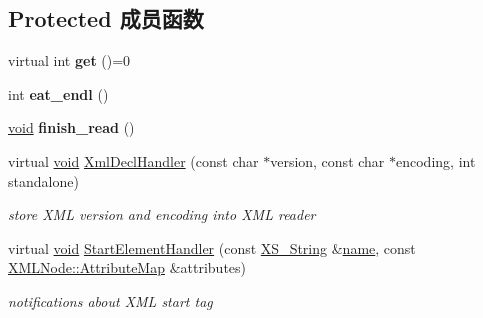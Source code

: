 \subsection*{Protected 成员函数}
\begin{DoxyCompactItemize}
\item 
\mbox{\label{struct_x_m_l_storage_1_1_x_m_l_reader_base_a57b853549c1a3f8ac5f17577f05d1724}} 
virtual int {\bfseries get} ()=0
\item 
\mbox{\label{struct_x_m_l_storage_1_1_x_m_l_reader_base_a24ae151486d9944db9fba64307551d3b}} 
int {\bfseries eat\+\_\+endl} ()
\item 
\mbox{\label{struct_x_m_l_storage_1_1_x_m_l_reader_base_a445261640670478c73941e375875541d}} 
\hyperlink{interfacevoid}{void} {\bfseries finish\+\_\+read} ()
\item 
\mbox{\label{struct_x_m_l_storage_1_1_x_m_l_reader_base_a2a79dba25ffe2739f26550fa778e5131}} 
virtual \hyperlink{interfacevoid}{void} \hyperlink{struct_x_m_l_storage_1_1_x_m_l_reader_base_a2a79dba25ffe2739f26550fa778e5131}{Xml\+Decl\+Handler} (const char $\ast$version, const char $\ast$encoding, int standalone)
\begin{DoxyCompactList}\small\item\em store X\+ML version and encoding into X\+ML reader \end{DoxyCompactList}\item 
\mbox{\label{struct_x_m_l_storage_1_1_x_m_l_reader_base_a13f8c23bfe885e07aab003e23facd674}} 
virtual \hyperlink{interfacevoid}{void} \hyperlink{struct_x_m_l_storage_1_1_x_m_l_reader_base_a13f8c23bfe885e07aab003e23facd674}{Start\+Element\+Handler} (const \hyperlink{struct_x_m_l_storage_1_1_x_s___string}{X\+S\+\_\+\+String} \&\hyperlink{structname}{name}, const \hyperlink{struct_x_m_l_storage_1_1_x_m_l_node_1_1_attribute_map}{X\+M\+L\+Node\+::\+Attribute\+Map} \&attributes)
\begin{DoxyCompactList}\small\item\em notifications about X\+ML start tag \end{DoxyCompactList}\item 

\end{DoxyCompactItemize}
